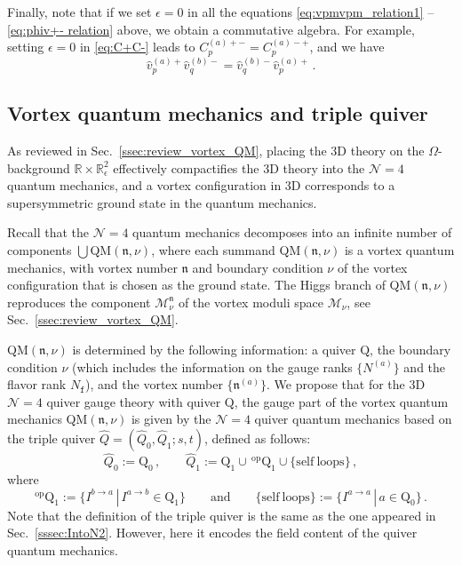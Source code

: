 \documentclass[12pt,a4paper]{article}
\newcommand{\nn}{\mathfrak{n}}
\renewcommand{\(}{\left(}
\renewcommand{\)}{\right)}
\renewcommand{\(}{\left(}
\renewcommand{\)}{\right)}
\begin{document}
\medskip

Finally, note that if we set $\epsilon=0$ in all the equations \eqref{eq:vpmvpm_relation1} -- \eqref{eq:phiv+- relation} above, we obtain a commutative algebra. 
For example, setting $\epsilon=0$ in \eqref{eq:C+C-} leads to $C^{(a)+-}_p=C^{(a)-+}_p$, and we have
\begin{equation}
\hat{v}^{(a)+}_p\hat{v}^{(b)-}_q=\hat{v}^{(b)-}_q\hat{v}^{(a)+}_p\,.
\end{equation}

\subsection{Vortex quantum mechanics and triple quiver}\label{ssec:VQM_and_triple}


As reviewed in Sec.~\ref{ssec:review_vortex_QM}, placing the 3D theory on the $\Omega$-background $\mathbb{R}\times \mathbb{R}^2_{\epsilon}$ effectively compactifies the 3D theory into the $\mathcal{N}=4$ quantum mechanics, and a vortex configuration in 3D corresponds to a supersymmetric ground state in the quantum mechanics. 

\medskip

Recall that the $\mathcal{N}=4$ quantum mechanics decomposes into an infinite number of components $\bigcup$QM$(\nn,\nu)$, where  each summand QM$(\nn,\nu)$ is a vortex quantum mechanics, with vortex number $\nn$ and 
boundary condition $\nu$ of the vortex configuration that is chosen as the ground state.
The Higgs branch of QM$(\nn,\nu)$ reproduces the component $\mathcal{M}^{\nn}_\nu$ of the vortex moduli space $\mathcal{M}_\nu$, see Sec.~\ref{ssec:review_vortex_QM}.

\medskip

QM$(\nn,\nu)$ is determined by the following information: a  quiver $\mathrm{Q}$,
the boundary condition $\nu$ (which includes the information on the gauge ranks $\{N^{(a)}\}$ and the flavor rank $N_{\mathtt{f}}$), and the vortex number $\{\nn^{(a)}\}$.
We propose that for the 3D $\mathcal{N}=4$ quiver gauge theory with quiver $\mathrm{Q}$, the gauge part of the vortex quantum mechanics QM$(\nn,\nu)$ is given by the $\mathcal{N}=4$ quiver quantum mechanics based on the triple quiver  $\widehat{Q}=(\widehat{Q}_0,\widehat{Q}_1; s,t)$, defined as follows:
\begin{equation}
	\widehat{Q}_0:=\mathrm{Q}_0\,, \qquad \widehat{Q}_1:=\mathrm{Q}_1\cup \,  {}^{\textrm{op}}\mathrm{Q}_1\cup
	\{\mathrm{self\ loops}\}\,,
\end{equation}
where
\begin{equation}
	{}^{\textrm{op}}\mathrm{Q}_1:=\{I^{b\rightarrow a}\, |\, I^{a\rightarrow b} \in \mathrm{Q}_1\}
	\qquad\textrm{and} \qquad
	\{\mathrm{self\ loops}\}:=\{I^{a\rightarrow a}\,|\, a\in \mathrm{Q}_0\}\,.
\end{equation}
Note that the definition of the triple quiver is the same as the one appeared in Sec.~\ref{sssec:IntoN2}. However, here it encodes the field content of the quiver quantum mechanics. 
\end{document}
